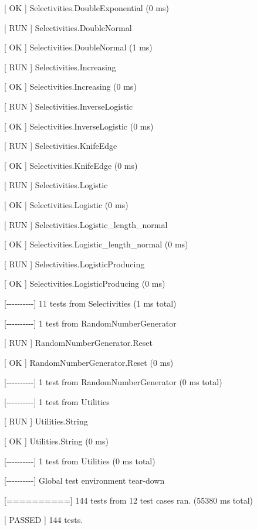 \documentclass[a4paper,11pt,twoside,pdftex,draft]{article}
\begin{document}
{[} OK {]} Selectivities.DoubleExponential (0 ms)

{[} RUN {]} Selectivities.DoubleNormal

{[} OK {]} Selectivities.DoubleNormal (1 ms)

{[} RUN {]} Selectivities.Increasing

{[} OK {]} Selectivities.Increasing (0 ms)

{[} RUN {]} Selectivities.InverseLogistic

{[} OK {]} Selectivities.InverseLogistic (0 ms)

{[} RUN {]} Selectivities.KnifeEdge

{[} OK {]} Selectivities.KnifeEdge (0 ms)

{[} RUN {]} Selectivities.Logistic

{[} OK {]} Selectivities.Logistic (0 ms)

{[} RUN {]} Selectivities.Logistic\_length\_normal

{[} OK {]} Selectivities.Logistic\_length\_normal (0 ms)

{[} RUN {]} Selectivities.LogisticProducing

{[} OK {]} Selectivities.LogisticProducing (0 ms)

{[}-\/-\/-\/-\/-\/-\/-\/-\/-\/-{]} 11 tests from Selectivities (1 ms
total)

{[}-\/-\/-\/-\/-\/-\/-\/-\/-\/-{]} 1 test from RandomNumberGenerator

{[} RUN {]} RandomNumberGenerator.Reset

{[} OK {]} RandomNumberGenerator.Reset (0 ms)

{[}-\/-\/-\/-\/-\/-\/-\/-\/-\/-{]} 1 test from RandomNumberGenerator (0
ms total)

{[}-\/-\/-\/-\/-\/-\/-\/-\/-\/-{]} 1 test from Utilities

{[} RUN {]} Utilities.String

{[} OK {]} Utilities.String (0 ms)

{[}-\/-\/-\/-\/-\/-\/-\/-\/-\/-{]} 1 test from Utilities (0 ms total)

{[}-\/-\/-\/-\/-\/-\/-\/-\/-\/-{]} Global test environment tear-down

{[}=========={]} 144 tests from 12 test cases ran. (55380 ms total)

{[} PASSED {]} 144 tests.
\end{document}
